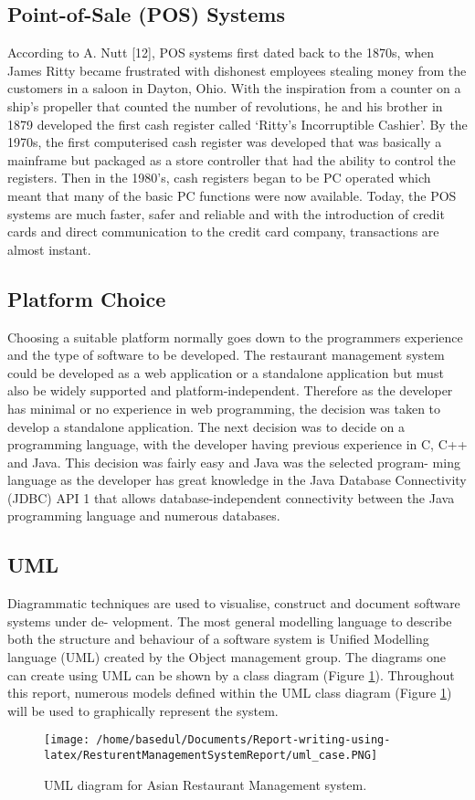 \documentclass[12pt,a4paper]{article}
\begin{document}
	\subsection{Point-of-Sale (POS) Systems}
	According to A. Nutt [12], POS systems first dated back to the 1870s, when James Ritty became
frustrated with dishonest employees stealing money from the customers in a saloon in Dayton, Ohio.
With the inspiration from a counter on a ship’s propeller that counted the number of revolutions, he
and his brother in 1879 developed the first cash register called ‘Ritty’s Incorruptible Cashier’.
By the 1970s, the first computerised cash register was developed that was basically a mainframe
but packaged as a store controller that had the ability to control the registers. Then in the 1980’s,
cash registers began to be PC operated which meant that many of the basic PC functions were now
available.
Today, the POS systems are much faster, safer and reliable and with the introduction of credit cards
and direct communication to the credit card company, transactions are almost instant.
\subsection{Platform Choice}
	Choosing a suitable platform normally goes down to the programmers experience and the type of
software to be developed. The restaurant management system could be developed as a web application
or a standalone application but must also be widely supported and platform-independent. Therefore
as the developer has minimal or no experience in web programming, the decision was taken to develop
a standalone application.
The next decision was to decide on a programming language, with the developer having previous
experience in C, C++ and Java. This decision was fairly easy and Java was the selected program-
ming language as the developer has great knowledge in the Java Database Connectivity (JDBC) API 1
that allows database-independent connectivity between the Java programming language and numerous
databases.
	\subsection{UML}
	\label{Sec:uml}
Diagrammatic techniques are used to visualise, construct and document software systems under de-
velopment. The most general modelling language to describe both the structure and behaviour of a
software system is Unified Modelling language (UML) created by the Object management group. The
diagrams one can create using UML can be shown by a class diagram (Figure \ref{fig:uml}). Throughout this
report, numerous models defined within the UML class diagram (Figure \ref{fig:uml}) will be used to graphically
represent the system.
	\begin{figure}
		\centering
		\texttt{[image: /home/basedul/Documents/Report-writing-using-latex/ResturentManagementSystemReport/uml\_case.PNG]}
		\caption{UML diagram for Asian Restaurant Management system.}
		\label{fig:uml} 
	\end{figure}
	
\end{document}
